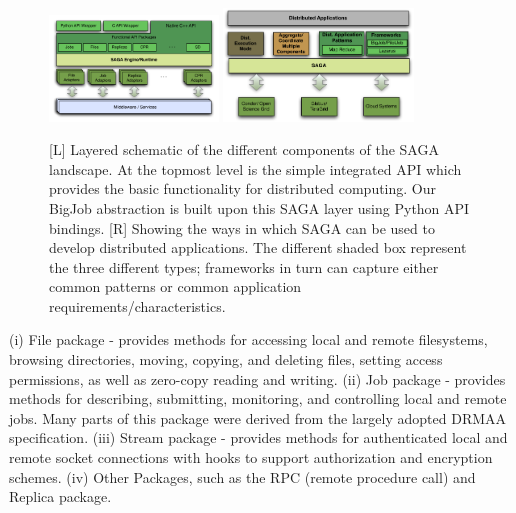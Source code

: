 \documentclass{rspublic}
\begin{document}
\begin{figure}[!ht]
 \begin{center}
     \includegraphics[width=0.40\textwidth]{stci_saga_figures-1.pdf}
    \includegraphics[width=0.45\textwidth]{distributed_applications_saga_figure.pdf}
\end{center}
\caption{\small [L] Layered schematic of the different components of
  the SAGA landscape. At the topmost level is the simple integrated
  API which provides the basic functionality for distributed
  computing. Our BigJob abstraction is built upon this SAGA layer
  using Python API bindings. [R] Showing the ways in which SAGA can be
  used to develop distributed applications. The different shaded box
  represent the three different types; frameworks in turn can capture
  either common patterns or common application
  requirements/characteristics.} \label{Fig:SAGA1}
\end{figure}

(i) File package - provides methods for accessing local and remote
filesystems, browsing directories, moving, copying, and deleting
files, setting access permissions, as well as zero-copy reading and
writing. (ii) Job package - provides methods for describing,
submitting, monitoring, and controlling local and remote jobs. Many
parts of this package were derived from the largely adopted DRMAA
specification. (iii) Stream package - provides methods for
authenticated local and remote socket connections with hooks to
support authorization and encryption schemes. (iv) Other Packages,
such as the RPC (remote procedure call) and Replica package.
\end{document}
